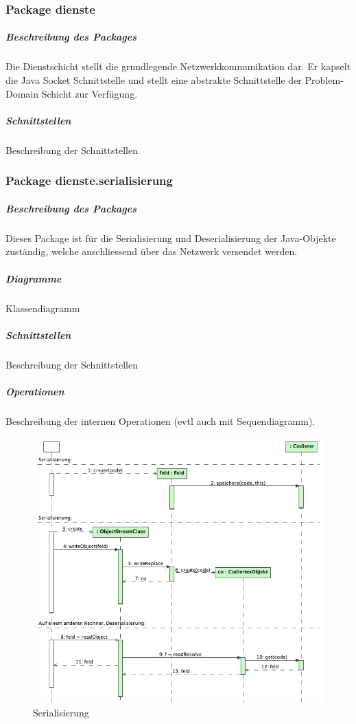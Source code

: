 \documentclass[a4paper,12pt,halfparskip,DIV14]{scrartcl}
\begin{document}
\newpage
\subsubsection{Package dienste} %
\label{ssub:package_dienste}
\subparagraph{Beschreibung des Packages} %
\label{ssub:beschreibung_des_packages}
Die Dienstschicht stellt die grundlegende Netzwerkkommunikation dar. Er kapselt die Java Socket Schnittstelle und stellt eine abstrakte Schnittstelle der Problem-Domain Schicht zur Verfügung.
\subparagraph{Schnittstellen} %
\label{ssub:schnittstellen}
Beschreibung der Schnittstellen

\newpage
\subsubsection{Package dienste.serialisierung} %
\label{ssub:package_dienste_serialisierung}
\subparagraph{Beschreibung des Packages} %
\label{ssub:beschreibung_des_packages}
Dieses Package ist für die Serialisierung und Deserialisierung der Java-Objekte zuständig, welche anschliessend über das Netzwerk versendet werden.
\subparagraph{Diagramme} %
\label{ssub:diagramme}
Klassendiagramm
\subparagraph{Schnittstellen} %
\label{ssub:schnittstellen}
Beschreibung der Schnittstellen
\subparagraph{Operationen} %
\label{ssub:operationen}
Beschreibung der internen Operationen (evtl auch mit Sequendiagramm).
\begin{figure}
	[htp] \centering 
	\includegraphics[width=1\textwidth]{dienste_serialisierung.png} \caption{Serialisierung}\label{fig:dienste_serialisierung.png} 
\end{figure}
\end{document}

